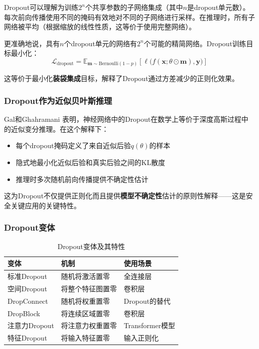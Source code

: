 Dropout可以理解为训练$2^n$个共享参数的子网络集成（其中$n$是dropout单元数）。每次前向传播使用不同的掩码有效地对不同的子网络进行采样。在推理时，所有子网络被平均（根据缩放的线性性质，这等价于使用完整网络）。

更准确地说，具有$n$个dropout单元的网络有$2^n$个可能的精简网络。Dropout训练目标最小化：
\begin{equation}
\mathcal{L}_{\text{dropout}} = \mathbb{E}_{\mathbf{m} \sim \text{Bernoulli}(1-p)} \left[\ell\bigl(f(\mathbf{x}; \theta \odot \mathbf{m}), \mathbf{y}\bigr)\right]
\end{equation}

这等价于最小化\textbf{装袋集成}目标，解释了Dropout通过方差减少的正则化效果。

\subsubsection{Dropout作为近似贝叶斯推理}

Gal和Ghahramani \cite{gal2016dropout}表明，神经网络中的Dropout在数学上等价于深度高斯过程中的近似变分推理。在这个解释下：
\begin{itemize}
    \item 每个dropout掩码定义了来自近似后验$q(\theta)$的样本
    \item 隐式地最小化近似后验和真实后验之间的KL散度
    \item 推理时多次随机前向传播提供不确定性估计
\end{itemize}

这为Dropout不仅提供正则化而且提供\textbf{模型不确定性}估计的原则性解释——这是安全关键应用的关键特性。

\subsubsection{Dropout变体}

\begin{table}[ht]
    \centering
    \caption{Dropout变体及其特性}
    \begin{tabular}{L{3cm} L{4cm} L{4cm}}
        \toprule
        \textbf{变体} & \textbf{机制} & \textbf{使用场景} \\
        \midrule
        标准Dropout & 随机将激活置零 & 全连接层 \\
        空间Dropout & 将整个特征图置零 & 卷积层 \\
        DropConnect & 随机将权重置零 & Dropout的替代 \\
        DropBlock & 将连续区域置零 & 卷积层 \\
        注意力Dropout & 将注意力权重置零 & Transformer模型 \\
        特征Dropout & 将输入特征置零 & 输入正则化 \\
        \bottomrule
    \end{tabular}
\end{table}

